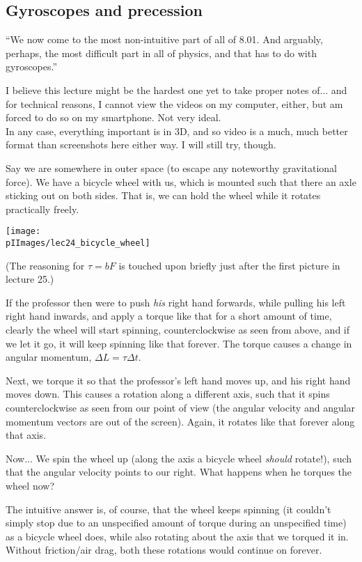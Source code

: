\subsection{Gyroscopes and precession}

``We now come to the most non-intuitive part of all of 8.01. And arguably, perhaps, the most difficult part in all of physics, and that has to do with gyroscopes.''

I believe this lecture might be the hardest one yet to take proper notes of... and for technical reasons, I cannot view the videos on my computer, either, but am forced to do so on my smartphone. Not very ideal.\\
In any case, everything important is in 3D, and so video is a much, much better format than screenshots here either way. I will still try, though.

Say we are somewhere in outer space (to escape any noteworthy gravitational force). We have a bicycle wheel with us, which is mounted such that there an axle sticking out on both sides. That is, we can hold the wheel while it rotates practically freely.

\begin{center}
\texttt{[image: \\pIImages/lec24\_bicycle\_wheel]}
\end{center}

(The reasoning for $\tau = b F$ is touched upon briefly just after the first picture in lecture 25.)

If the professor then were to push \emph{his} right hand forwards, while pulling his left right hand inwards, and apply a torque like that for a short amount of time, clearly the wheel will start spinning, counterclockwise as seen from above, and if we let it go, it will keep spinning like that forever. The torque causes a change in angular momentum, $\Delta L = \tau \Delta t$.

Next, we torque it so that the professor's left hand moves up, and his right hand moves down. This causes a rotation along a different axis, such that it spins counterclockwise as seen from our point of view (the angular velocity and angular momentum vectors are out of the screen). Again, it rotates like that forever along that axis.

Now... We spin the wheel up (along the axis a bicycle wheel \emph{should} rotate!), such that the angular velocity points to our right. What happens when he torques the wheel now?

The intuitive answer is, of course, that the wheel keeps spinning (it couldn't simply stop due to an unspecified amount of torque during an unspecified time) as a bicycle wheel does, while also rotating about the axis that we torqued it in. Without friction/air drag, both these rotations would continue on forever.

